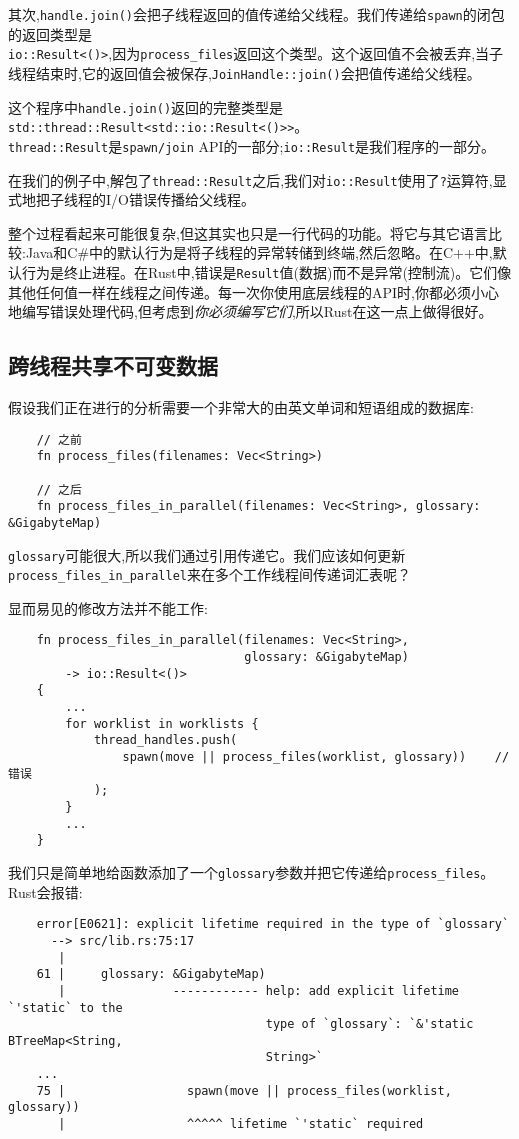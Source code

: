 其次,\texttt{handle.join()}会把子线程返回的值传递给父线程。我们传递给\texttt{spawn}的闭包的返回类型是\\
\texttt{io::Result<()>},因为\texttt{process\_files}返回这个类型。这个返回值不会被丢弃,当子线程结束时,它的返回值会被保存,\texttt{JoinHandle::join()}会把值传递给父线程。

这个程序中\texttt{handle.join()}返回的完整类型是\texttt{std::thread::Result<std::io::Result<()>>}。\\
\texttt{thread::Result}是\texttt{spawn/join} API的一部分;\texttt{io::Result}是我们程序的一部分。

在我们的例子中,解包了\texttt{thread::Result}之后,我们对\texttt{io::Result}使用了\texttt{?}运算符,显式地把子线程的I/O错误传播给父线程。

整个过程看起来可能很复杂,但这其实也只是一行代码的功能。将它与其它语言比较:Java和C\#中的默认行为是将子线程的异常转储到终端,然后忽略。在C++中,默认行为是终止进程。在Rust中,错误是\texttt{Result}值(数据)而不是异常(控制流)。它们像其他任何值一样在线程之间传递。每一次你使用底层线程的API时,你都必须小心地编写错误处理代码,但考虑到\emph{你必须编写它们},所以Rust在这一点上做得很好。

\subsection{跨线程共享不可变数据}
假设我们正在进行的分析需要一个非常大的由英文单词和短语组成的数据库:
\begin{verbatim}
    // 之前
    fn process_files(filenames: Vec<String>)

    // 之后
    fn process_files_in_parallel(filenames: Vec<String>, glossary: &GigabyteMap)
\end{verbatim}

\texttt{glossary}可能很大,所以我们通过引用传递它。我们应该如何更新\texttt{process\_files\_in\_parallel}来在多个工作线程间传递词汇表呢？

显而易见的修改方法并不能工作:
\begin{verbatim}
    fn process_files_in_parallel(filenames: Vec<String>,
                                 glossary: &GigabyteMap)
        -> io::Result<()>
    {
        ...
        for worklist in worklists {
            thread_handles.push(
                spawn(move || process_files(worklist, glossary))    // 错误
            );
        }
        ...
    }
\end{verbatim}

我们只是简单地给函数添加了一个\texttt{glossary}参数并把它传递给\texttt{process\_files}。Rust会报错:
\begin{verbatim}
    error[E0621]: explicit lifetime required in the type of `glossary`
      --> src/lib.rs:75:17
       |
    61 |     glossary: &GigabyteMap)
       |               ------------ help: add explicit lifetime `'static` to the 
                                    type of `glossary`: `&'static BTreeMap<String,
                                    String>`
    ...
    75 |                 spawn(move || process_files(worklist, glossary))
       |                 ^^^^^ lifetime `'static` required
\end{verbatim}

